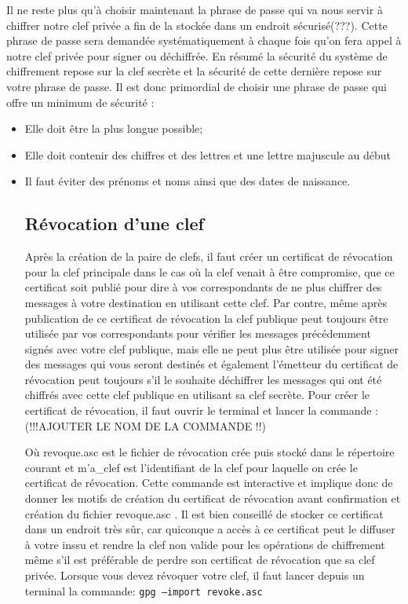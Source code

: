 \begin{itemize}
Il ne reste plus qu'à choisir maintenant la phrase de passe qui va nous servir à chiffrer notre clef privée a fin de la stockée 
dans un endroit sécurisé(???). Cette phrase de passe sera demandée systématiquement à chaque fois qu'on fera appel à notre clef privée pour
signer ou déchiffrée.
En résumé la sécurité du système de chiffrement repose sur la clef secrète et la sécurité de cette dernière repose sur votre 
phrase de passe.
Il est donc primordial de choisir une phrase de passe qui offre un minimum de sécurité :
\begin{itemize}
\item Elle doit être la plus longue possible;
\item Elle doit contenir des chiffres et des lettres et une lettre majuscule au début
\item Il faut éviter des prénoms et noms ainsi que des dates de naissance. 

 
\subsection {Révocation d'une clef}
 Après la création de la paire de clefs, il faut créer un certificat de révocation pour la clef principale dans le cas où la clef
venait à être compromise, que ce certificat soit publié pour dire à vos correspondants de ne plus chiffrer des messages à votre
destination en utilisant cette  clef. Par contre, même après publication de ce certificat de révocation la clef publique peut toujours 
être utilisée par vos correspondants pour vérifier les messages précédemment signés avec votre clef publique, mais elle ne peut plus 
être utilisée pour signer des messages qui vous seront destinés et également l'émetteur du certificat de révocation peut toujours 
s'il  le souhaite déchiffrer les messages qui ont été chiffrés avec cette clef publique en utilisant sa clef secrète.
Pour créer le certificat de révocation, il faut ouvrir le terminal et lancer la commande : (!!!AJOUTER LE NOM DE LA COMMANDE !!)

Où revoque.asc est le fichier de révocation crée puis stocké dans le répertoire courant et m’a\_clef est l'identifiant de la clef pour
laquelle on crée le certificat de révocation.
Cette commande est interactive et implique donc de donner les motifs de création du certificat de révocation avant confirmation et 
création du fichier revoque.asc .
Il est bien conseillé de stocker ce certificat dans un endroit très sûr, car quiconque a accès à ce certificat peut le diffuser à votre inssu
et rendre la clef non valide pour les opérations de chiffrement même s'il est préférable de perdre son certificat de révocation que sa clef privée.
Lorsque vous devez révoquer votre clef, il faut lancer depuis un terminal la commande:
\texttt{gpg --import revoke.asc } \\



\end{itemize}
\end{itemize}
